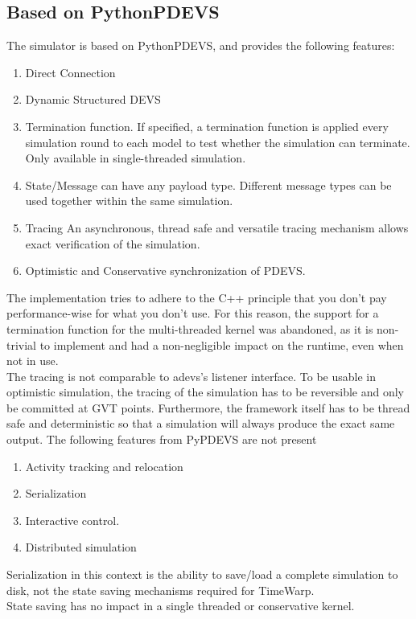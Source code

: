 \subsection{Based on PythonPDEVS}
The simulator is based on PythonPDEVS, and provides the following features: 
\begin{enumerate}
	\item Direct Connection
	\item Dynamic Structured DEVS
	\item Termination function. If specified, a termination function is applied every simulation round to each model to test whether the simulation can terminate. Only available in single-threaded simulation.
	\item State/Message can have any payload type. Different message types can be used together within the same simulation.
	\item Tracing An asynchronous, thread safe and versatile tracing mechanism allows exact verification of the simulation.
	\item Optimistic and Conservative synchronization of PDEVS.
\end{enumerate}
The implementation tries to adhere to the C++ principle that you don't pay performance-wise for what you don't use. For this reason, the support for a termination function for the multi-threaded kernel was abandoned, as it is non-trivial to implement and had a non-negligible impact on the runtime, even when not in use.\\
The tracing is not comparable to adevs's listener interface. To be usable in optimistic simulation, the tracing of the simulation has to be reversible and only be committed at GVT points. Furthermore, the framework itself has to be thread safe and deterministic so that a simulation will always produce the exact same output.
The following features from PyPDEVS are not present
\begin{enumerate}
	\item Activity tracking and relocation
	\item Serialization
	\item Interactive control. 
	\item Distributed simulation
\end{enumerate}
Serialization in this context is the ability to save/load a complete simulation to disk, not the state saving mechanisms required for TimeWarp.\\ State saving has no impact in a single threaded or conservative kernel.\\
